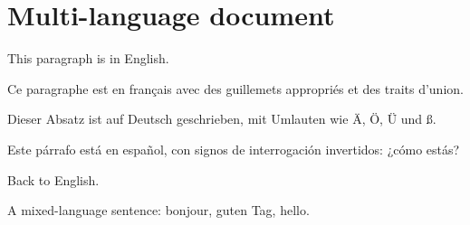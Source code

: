 \documentclass{article}
\begin{document}
\section{Multi-language document}

This paragraph is in English.

Ce paragraphe est en français avec des guillemets appropriés et des traits d'union.

Dieser Absatz ist auf Deutsch geschrieben, mit Umlauten wie Ä, Ö, Ü und ß.

Este párrafo está en español, con signos de interrogación invertidos: ¿cómo estás?

Back to English.

A mixed-language sentence: \foreignlanguage{french}{bonjour}, \foreignlanguage{german}{guten Tag}, hello.
\end{document}
